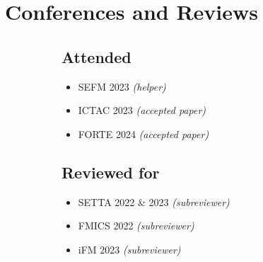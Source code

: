 \documentclass[11pt]{article}
\renewcommand\labelitemi{}
\begin{document}
\begin{itemize}
	\end{itemize}
	\renewcommand\labelitemi{$\circ$}
	\section*{Conferences and Reviews}
	\begin{figure}[h]
	\begin{subfigure}[t]{0.5\textwidth}
		\subsection*{Attended}
		\begin{itemize}[noitemsep, nolistsep]
			\item SEFM 2023 \textit{(helper)}
			\item ICTAC 2023 \textit{(accepted paper)}
			\item FORTE 2024 \textit{(accepted paper)}
		\end{itemize}
	\end{subfigure}
	\begin{subfigure}[t]{0.5\textwidth}
		\subsection*{Reviewed for}
		\begin{itemize}[noitemsep, nolistsep]
			\item SETTA 2022 \& 2023 \textit{(subreviewer)}
			\item FMICS 2022 \textit{(subreviewer)}
			\item iFM 2023 \textit{(subreviewer)}
		\end{itemize}
	\end{subfigure}
	\end{figure}
\end{document}
